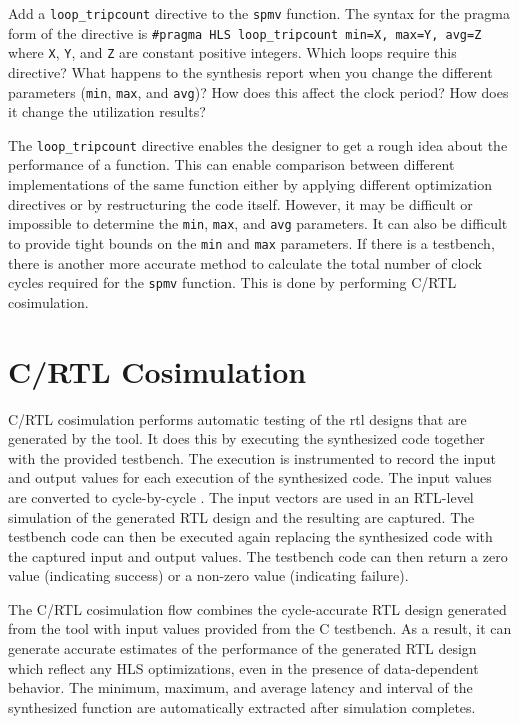 \begin{exercise}
Add a \lstinline{loop_tripcount} directive to the \lstinline{spmv} function. The syntax for the pragma form of the directive is \lstinline{#pragma HLS loop_tripcount min=X, max=Y, avg=Z} where \lstinline{X}, \lstinline{Y}, and \lstinline{Z} are constant positive integers. Which loops require this directive? What happens to the synthesis report when you change the different parameters (\lstinline{min}, \lstinline{max}, and \lstinline{avg})? How does this affect the clock period? How does it change the utilization results?
\end{exercise}

The \lstinline{loop_tripcount} directive enables the designer to get a rough idea about the performance of a function. This can enable comparison between different implementations of the same function either by applying different optimization directives or by restructuring the code itself.  However, it may be difficult or impossible to determine the \lstinline{min}, \lstinline{max}, and \lstinline{avg} parameters.  It can also be difficult to provide tight bounds on the \lstinline{min} and \lstinline{max} parameters. If there is a testbench, there is another more accurate method to calculate the total number of clock cycles required for the \lstinline{spmv} function. This is done by performing C/RTL cosimulation. 

\section{C/RTL Cosimulation}

C/RTL cosimulation performs automatic testing of the \gls{rtl} designs that are generated by the \VHLS tool. It does this by executing the synthesized code together with the provided testbench. The execution is instrumented to record the input and output values for each execution of the synthesized code. The input values are converted to cycle-by-cycle .  The input vectors are used in an RTL-level simulation of the generated RTL design and the resulting  are captured.  The testbench code can then be executed again replacing the synthesized code with the captured input and output values.  The testbench code can then return a zero value (indicating success) or a non-zero value (indicating failure).

The C/RTL cosimulation flow combines the cycle-accurate RTL design generated from the \VHLS tool with input values provided from the C testbench. As a result, it can generate accurate estimates of the performance of the generated RTL design which reflect any HLS optimizations, even in the presence of data-dependent behavior.  The minimum, maximum, and average latency and interval of the synthesized function are automatically extracted after simulation completes.

